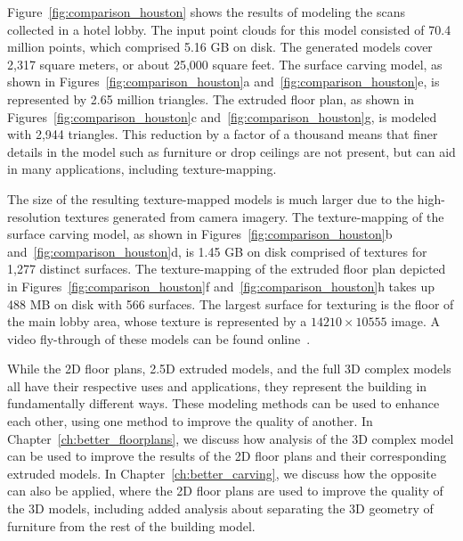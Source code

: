 \documentclass[12pt,onecolumn,oneside]{book}
\begin{document}
Figure~\ref{fig:comparison_houston} shows the results of modeling the scans collected in a hotel lobby.  The input point clouds for this model consisted of 70.4 million points, which comprised 5.16 GB on disk.  The generated models cover 2,317 square meters, or about 25,000 square feet.  The surface carving model, as shown in Figures~\ref{fig:comparison_houston}a and~\ref{fig:comparison_houston}e, is represented by 2.65 million triangles.  The extruded floor plan, as shown in Figures~\ref{fig:comparison_houston}c and~\ref{fig:comparison_houston}g, is modeled with 2,944 triangles.  This reduction by a factor of a thousand means that finer details in the model such as furniture or drop ceilings are not present, but can aid in many applications, including texture-mapping.

The size of the resulting texture-mapped models is much larger due to the high-resolution textures generated from camera imagery.  The texture-mapping of the surface carving model, as shown in Figures~\ref{fig:comparison_houston}b and~\ref{fig:comparison_houston}d, is 1.45 GB on disk comprised of textures for 1,277 distinct surfaces.  The texture-mapping of the extruded floor plan depicted in Figures~\ref{fig:comparison_houston}f and~\ref{fig:comparison_houston}h takes up 488 MB on disk with 566 surfaces.  The largest surface for texturing is the floor of the main lobby area, whose texture is represented by a $14210 \times 10555$ image.  A video fly-through of these models can be found online~\cite{video}.

While the 2D floor plans, 2.5D extruded models, and the full 3D complex models all have their respective uses and applications, they represent the building in fundamentally different ways.  These modeling methods can be used to enhance each other, using one method to improve the quality of another.  In Chapter~\ref{ch:better_floorplans}, we discuss how analysis of the 3D complex model can be used to improve the results of the 2D floor plans and their corresponding extruded models.  In Chapter~\ref{ch:better_carving}, we discuss how the opposite can also be applied, where the 2D floor plans are used to improve the quality of the 3D models, including added analysis about separating the 3D geometry of furniture from the rest of the building model.

\end{document}
